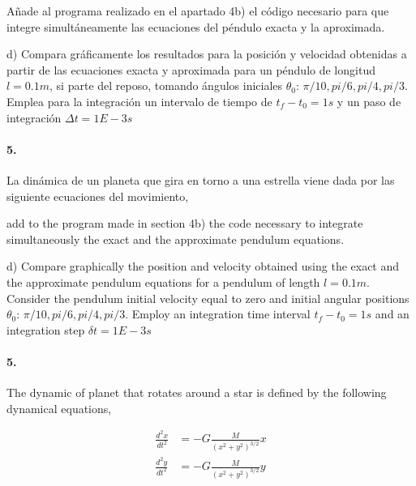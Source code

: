 \begin{paracol}{2}
\noindent Añade al programa realizado en el apartado 4b) el código necesario para que integre simultáneamente las ecuaciones del péndulo exacta y la aproximada.

d) Compara gráficamente los resultados para la posición y velocidad obtenidas a partir de las ecuaciones exacta y aproximada para un péndulo de longitud $l=0.1m$, si parte del reposo, tomando ángulos iniciales $\theta_0$: $\pi/10, pi/6, pi/4, pi/3$. Emplea para la integración un intervalo de tiempo de $t_f-t_0 = 1s$ y un paso de integración $\Delta t=1E-3s$

\paragraph{5.} La dinámica de un planeta que gira en torno a una estrella viene dada por las siguiente ecuaciones del movimiento,

\switchcolumn
\noindent add to the program made in section 4b) the code necessary to integrate simultaneously the exact and the approximate pendulum equations.

d) Compare graphically the position and velocity obtained using the exact and the approximate pendulum equations for a pendulum of length $l = 0.1m$. Consider the pendulum initial velocity equal to zero and initial angular positions $\theta_0$: $\pi/10, pi/6, pi/4, pi/3$. Employ an integration time interval $t_f-t_0 =1s$ and an integration step $\delta t = 1E-3 s$

\paragraph{5.} The dynamic of planet that rotates around a star is defined by the following dynamical equations, 
\end{paracol}

\begin{align*}
\frac{d^2x}{dt^2} &= -G\frac{M}{(x^2+y^2)^{3/2}}x\\
\frac{d^2y}{dt^2} &= -G\frac{M}{(x^2+y^2)^{3/2}}y
\end{align*}

